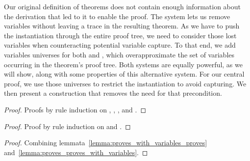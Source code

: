 Our original definition of theorems does not contain enough information about the derivation that led to it to enable the proof.
The system lets us remove variables without leaving a trace in the resulting theorem.
As we have to push the instantiation through the entire proof tree, we need to consider those lost variables when counteracting potential variable capture.
To that end, we add variables universes for both  and , which overapproximate the set of variables occurring in the theorem's proof tree.
Both systems are equally powerful, as we will show, along with some properties of this alternative system.
For our central proof, we use those universes to restrict the instantiation to avoid capturing.
We then present a construction that removes the need for that precondition.


\begin{lemma}
\end{lemma}
\begin{lemma}
\end{lemma}
\begin{lemma}
\end{lemma}
\begin{lemma}
\end{lemma}
\begin{lemma}
\end{lemma}
\begin{lemma}
\end{lemma}
\begin{proof}
    Proofs by rule induction on \isa{\(\Gamma\)}, \isa{\(\Psi\)}, \isa{\(\Omega\)}, and .
\end{proof}

\begin{lemma}
\end{lemma}
\begin{proof}
    Proof by rule induction on \isa{\(\Gamma\)} and .
\end{proof}

\begin{corollary}
\end{corollary}
\begin{proof}
    Combining lemmata~\ref{lemma:proves_with_variables_proves} and~\ref{lemma:proves_proves_with_variables}.
\end{proof}

